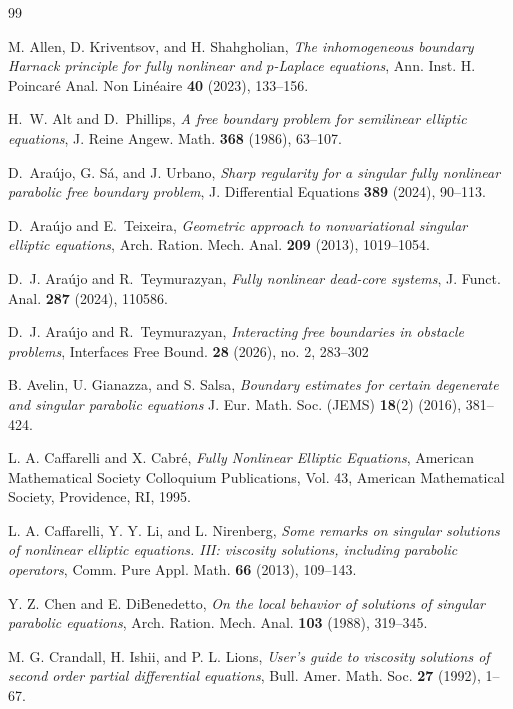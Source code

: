 \documentclass[11pt,oneside,english]{amsart}
\numberwithin{equation}{section}
\theoremstyle{plain}
\numberwithin{equation}{section}
\begin{document}
\begin{thebibliography}{99}

M. Allen, D. Kriventsov, and H. Shahgholian,
\textit{The inhomogeneous boundary Harnack principle for fully nonlinear and $p$-Laplace equations},
Ann. Inst. H. Poincaré Anal. Non Linéaire \textbf{40} (2023), 133--156.

H.~W. Alt and D.~Phillips,
\emph{A free boundary problem for semilinear elliptic equations},
J. Reine Angew. Math. \textbf{368} (1986), 63--107.

D.~Ara\'{u}jo, G. S\'a, and J. Urbano,
\emph{Sharp regularity for a singular fully nonlinear parabolic free boundary problem},
J. Differential Equations \textbf{389} (2024), 90--113.

D.~Ara\'{u}jo and E.~Teixeira,
\emph{Geometric approach to nonvariational singular elliptic equations},
Arch. Ration. Mech. Anal. \textbf{209} (2013), 1019--1054.

D.~J. Araújo and R.~Teymurazyan,
\emph{Fully nonlinear dead-core systems},
J. Funct. Anal. \textbf{287} (2024), 110586.

D.~J. Araújo and R.~Teymurazyan,
\emph{Interacting free boundaries in obstacle problems},
Interfaces Free Bound. \textbf{28} (2026), no. 2, 283–302


 B. Avelin, U. Gianazza, and S. Salsa,  
 \emph{Boundary estimates for certain degenerate and singular parabolic equations} 
J. Eur. Math. Soc. (JEMS) \textbf{18}(2) (2016), 381--424. 


L. A. Caffarelli and X. Cabr\'{e},
\emph{Fully Nonlinear Elliptic Equations},
American Mathematical Society Colloquium Publications, Vol. 43,
American Mathematical Society, Providence, RI, 1995.

L. A. Caffarelli, Y. Y. Li, and L. Nirenberg,
\emph{Some remarks on singular solutions of nonlinear elliptic equations. III: viscosity solutions, including parabolic operators},
Comm. Pure Appl. Math. \textbf{66} (2013), 109--143.

Y. Z. Chen and E. DiBenedetto,
\emph{On the local behavior of solutions of singular parabolic equations},
Arch. Ration. Mech. Anal. \textbf{103} (1988), 319--345.

M. G. Crandall, H. Ishii, and P. L. Lions,
\emph{User’s guide to viscosity solutions of second order partial differential equations},
Bull. Amer. Math. Soc. \textbf{27} (1992), 1--67.


\end{thebibliography}
\end{document}
